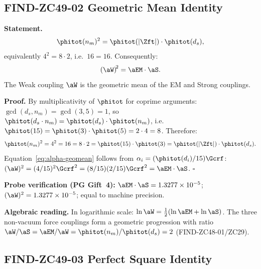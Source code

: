 \documentclass[12pt, a4paper]{article}
\begin{document}
\subsection{FIND-ZC49-02 \quad Geometric Mean Identity}
\label{sec:find02}

\begin{derivedbox}[title={FIND-ZC49-02: $\alpha_{\rm Weak}$
  is the Geometric Mean of $\alpha_{\rm EM}$
  and $\alpha_{\rm Strong}$}]
\textbf{Statement.}
\begin{equation}
  \phitot(n_m)^2 = \phitot(|\Zft|)\cdot\phitot(d_s),
  \label{eq:phi-geomean}
\end{equation}
equivalently $4^2 = 8\cdot 2$, i.e.\ $16 = 16$.
Consequently:
\begin{equation}
  \left(\aW\right)^{\!2} = \aEM\cdot\aS.
  \label{eq:alpha-geomean}
\end{equation}
The Weak coupling $\aW$ is the geometric mean of the EM and
Strong couplings.

\textbf{Proof.}
By multiplicativity of $\phitot$ for coprime arguments:
$\gcd(d_s, n_m) = \gcd(3,5) = 1$, so
$\phitot(d_s\cdot n_m) = \phitot(d_s)\cdot\phitot(n_m)$,
i.e.\ $\phitot(15) = \phitot(3)\cdot\phitot(5) = 2\cdot 4 = 8$.
Therefore:
\[
  \phitot(n_m)^2 = 4^2 = 16 = 8\cdot 2
  = \phitot(15)\cdot\phitot(3)
  = \phitot(|\Zft|)\cdot\phitot(d_s).
\]
Equation~\eqref{eq:alpha-geomean} follows from
$\alpha_i = (\phitot(d_i)/15)\Gcrf$:
$(\aW)^2 = (4/15)^2\Gcrf^2 = (8/15)(2/15)\Gcrf^2
= \aEM\cdot\aS$.
\hfill$\square$

\textbf{Probe verification (PG Gift~4):}
$\aEM\cdot\aS = 1.3277\times10^{-5}$;
$(\aW)^2 = 1.3277\times10^{-5}$;
equal to machine precision.

\textbf{Algebraic reading.}
In logarithmic scale:
$\ln\aW = \tfrac{1}{2}(\ln\aEM + \ln\aS)$.
The three non-vacuum force couplings form a geometric
progression with ratio $\aW/\aS = \aEM/\aW
= \phitot(n_m)/\phitot(d_s) = 2$ (FIND-ZC48-01/ZC29).
\end{derivedbox}

\subsection{FIND-ZC49-03 \quad Perfect Square Identity}
\label{sec:find03}
\end{document}
